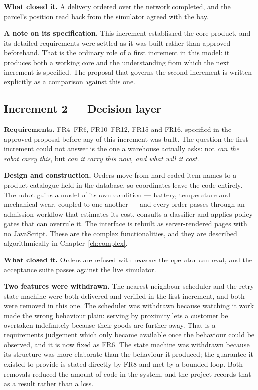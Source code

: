 \documentclass[12pt,a4paper]{report}
\begin{document}
\textbf{What closed it.} A delivery ordered over the network completed, and the parcel's position
read back from the simulator agreed with the bay.

\textbf{A note on its specification.} This increment established the core product, and its detailed
requirements were settled as it was built rather than approved beforehand. That is the ordinary
role of a first increment in this model: it produces both a working core and the understanding from
which the next increment is specified. The proposal that governs the second increment is written
explicitly as a comparison against this one.

\subsection{Increment 2 --- Decision layer}
\textbf{Requirements.} FR4--FR6, FR10--FR12, FR15 and FR16, specified in the approved proposal
before any of this increment was built. The question the first increment could not answer is the
one a warehouse actually asks: not \emph{can the robot carry this}, but \emph{can it carry this
now, and what will it cost}.

\textbf{Design and construction.} Orders move from hard-coded item names to a product catalogue held
in the database, so coordinates leave the code entirely. The robot gains a model of its own
condition --- battery, temperature and mechanical wear, coupled to one another --- and every order
passes through an admission workflow that estimates its cost, consults a classifier and applies
policy gates that can overrule it. The interface is rebuilt as server-rendered pages with no
JavaScript. These are the complex functionalities, and they are described algorithmically in
Chapter~\ref{ch:complex}.

\textbf{What closed it.} Orders are refused with reasons the operator can read, and the acceptance
suite passes against the live simulator.

\textbf{Two features were withdrawn.} The nearest-neighbour scheduler and the retry state machine
were both delivered and verified in the first increment, and both were removed in this one. The
scheduler was withdrawn because watching it work made the wrong behaviour plain: serving by
proximity lets a customer be overtaken indefinitely because their goods are further away. That is a
requirements judgement which only became available once the behaviour could be observed, and it is
now fixed as FR6. The state machine was withdrawn because its structure was more elaborate than the
behaviour it produced; the guarantee it existed to provide is stated directly by FR8 and met by a
bounded loop. Both removals reduced the amount of code in the system, and the project records that
as a result rather than a loss.
\end{document}
